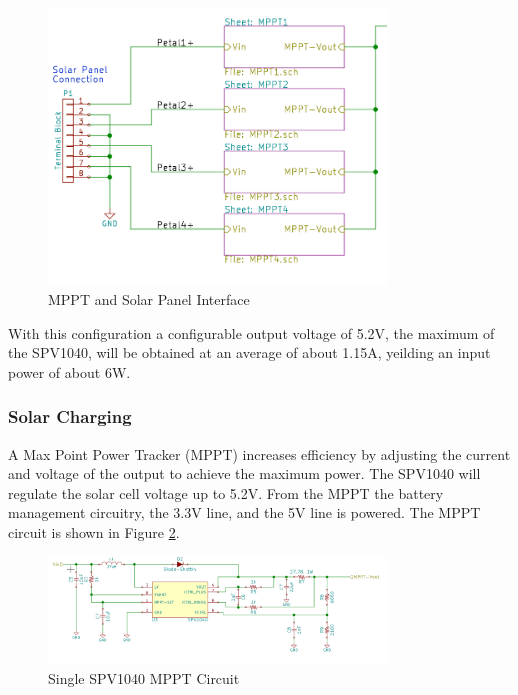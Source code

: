 \documentclass{article}
\numberwithin{figure}{section}
\numberwithin{equation}{section}
\begin{document}
{\begin{figure}[H]
	\centering
	\includegraphics[width=0.8\textwidth]{MPPTblocks}
	\caption{MPPT and Solar Panel Interface}
	\label{fig:mpptsol}
\end{figure}

With this configuration a configurable output voltage of 5.2V, the maximum of the SPV1040, will be obtained at an average of about 1.15A, yeilding an input power of about 6W.

\subsubsection{Solar Charging}

A Max Point Power Tracker (MPPT) increases efficiency by adjusting the current and voltage of the output to achieve the maximum power. The SPV1040 will regulate the solar cell voltage up to 5.2V. From the MPPT the battery management circuitry, the 3.3V line, and the 5V line is powered. The MPPT circuit is shown in Figure \ref{fig:singlemppt}.

\begin{figure}[H]
	\centering
	\includegraphics[width=0.8\textwidth]{singlempptcircuit}
	\caption{Single SPV1040 MPPT Circuit}
	\label{fig:singlemppt}
\end{figure}

}
\end{document}
